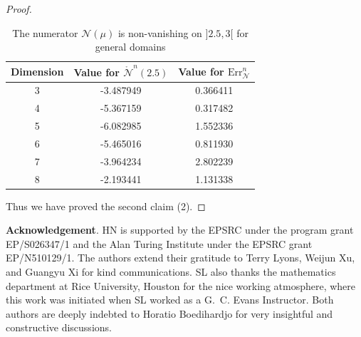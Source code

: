 \documentclass[11pt,a4paper,english,reqno]{amsart}
\theoremstyle{plain}
\newcommand{\1}{\mathbbm{1}}
\begin{document}
\begin{proof}
\begin{table}[ht]
\caption{The numerator $\mathcal{N}(\mu)$ is non-vanishing on $]2.5,3[$ for general domains} %
\centering %
\begin{tabular}{c c c} %
\hline\hline %
Dimension & Value for $\mathring{\mathcal{N}}^n(2.5)$ & Value for $\text{Err}^n_{\mathcal{N}}$ \\ [0.5ex] %
\hline %
3 & -3.487949  &  0.366411\\ %
4 & -5.367159 & 0.317482\\
5 &-6.082985  & 1.552336 \\
6 & -5.465016 &  0.811930 \\
7 & -3.964234 &  2.802239\\
8 & -2.193441 & 1.131338 \\ [1ex] %
\hline %
\end{tabular}
\label{table:arb d_domain_numerator}
\end{table}

Thus we have proved the second claim (2).   \end{proof}


\bigskip

\noindent
{\bf Acknowledgement}. HN is supported by the EPSRC under the program grant EP/S026347/1 and the Alan Turing Institute under the EPSRC grant EP/N510129/1. 
The authors extend their gratitude to Terry Lyons, Weijun Xu, and Guangyu Xi for kind communications. SL also thanks the mathematics department at Rice University, Houston for the nice working atmosphere, where this work was initiated when SL worked as a G.~C. Evans Instructor. Both authors are deeply indebted to Horatio Boedihardjo for very insightful and constructive discussions.
\end{document}
